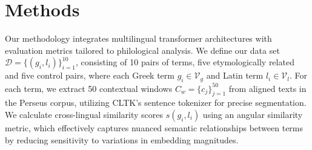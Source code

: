 \documentclass[11pt]{article} %
\begin{document}
\section{Methods}
Our methodology integrates multilingual transformer architectures with evaluation metrics tailored to philological analysis. We define our data set $\mathcal{D} = \{(g_i, l_i)\}_{i=1}^{10}$, consisting of 10 pairs of terms, five etymologically related and five control pairs, where each Greek term $g_i \in \mathcal{V}_g$ and Latin term $l_i \in \mathcal{V}_l$. For each term, we extract 50 contextual windows $C_w = \{c_j\}_{j=1}^{50}$ from aligned texts in the Perseus corpus, utilizing CLTK's sentence tokenizer for precise segmentation. We calculate cross-lingual similarity scores $s(g_i,l_i)$ using an angular similarity metric, which effectively captures nuanced semantic relationships between terms by reducing sensitivity to variations in embedding magnitudes.
\end{document}
